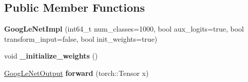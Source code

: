 \subsection*{Public Member Functions}
\begin{DoxyCompactItemize}
\item 
\mbox{\label{structvision_1_1models_1_1GoogLeNetImpl_a03d97ce69c821be2bd009f13fbed0aeb}} 
{\bfseries Goog\+Le\+Net\+Impl} (int64\+\_\+t num\+\_\+classes=1000, bool aux\+\_\+logits=true, bool transform\+\_\+input=false, bool init\+\_\+weights=true)
\item 
\mbox{\label{structvision_1_1models_1_1GoogLeNetImpl_a3be8816bceb5455bdb38e21908bf98d8}} 
void {\bfseries \+\_\+initialize\+\_\+weights} ()
\item 
\mbox{\label{structvision_1_1models_1_1GoogLeNetImpl_a2925b70d537a78b21bfb1b6c630c78a1}} 
\hyperlink{structvision_1_1models_1_1GoogLeNetOutput}{Goog\+Le\+Net\+Output} {\bfseries forward} (torch\+::\+Tensor x)
\end{DoxyCompactItemize}
